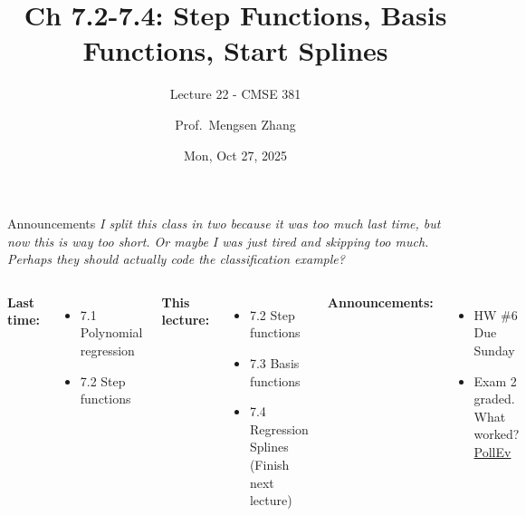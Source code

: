\documentclass[aspectratio=169,usenames,dvipsnames]{beamer}
\newcommand{\InstructorNotes}[1]{\textit{\color{orange}#1}}
\begin{document}
\title[]{Ch 7.2-7.4: Step Functions, Basis Functions, Start Splines }
\subtitle{Lecture 22 - CMSE 381}
\date{Mon, Oct 27, 2025}



\author[Dr.~Zhang]{Prof.~Mengsen Zhang}

\begin{frame}
 \titlepage


\end{frame}
\begin{frame}[c]{Announcements}
\InstructorNotes{I split this class in two because it was too much last time, but now this is way too short. Or maybe I was just tired and skipping too much. Perhaps they should actually code the classification example? }
\begin{columns}
\centering

	\textbf{Last time:}
	\begin{itemize}
	\item 7.1 Polynomial regression 
	\item 7.2 Step functions
	\end{itemize}

	\vspace{.2in}

	\textbf{This lecture:}
	\begin{itemize}
	\item 7.2 Step functions
	\item 7.3 Basis functions
	\item 7.4 Regression Splines (Finish next lecture)
\end{itemize}


\centering

\textbf{Announcements:}
	\begin{itemize}
		\item HW \#6 Due Sunday
		\item Exam 2 graded. What worked? \href{https://PollEv.com/multiple_choice_polls/9vANQyoPcWiwin31KwCko/respond}{PollEv}
	\end{itemize}
\end{columns}

\end{frame}
\end{document}
